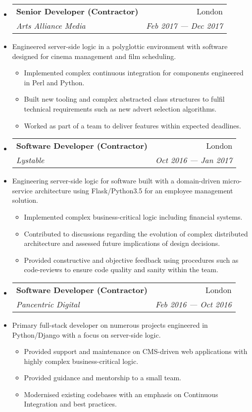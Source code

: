 \documentclass[letterpaper,11pt]{article}
\makeatletter
\newcommand{\ressubheading}[4]
    {\begin{tabular*}{180mm}{l@{\extracolsep{\fill}}r}
        \textbf{#1} & #2 \\
        \textit{#3} & \textit{#4} \\
    \end{tabular*}\vspace{-6pt}}
\newcommand{\resdescription}[1]{#1 \vspace{-0mm}}
\newcommand{\resitem}[1]{\item #1 \vspace{-2pt}}
\makeatother
\begin{document}
\begin{itemize}
        \item[]
            \ressubheading{Senior Developer (Contractor)}{London}{Arts Alliance Media}{Feb 2017 --- Dec 2017}
        \item[]
            \resdescription{Engineered server-side logic in a polyglottic environment with software designed for cinema management and film scheduling.}
            \begin{itemize}
                    \resitem{Implemented complex continuous integration for components engineered in Perl and Python.}
                    \resitem{Built new tooling and complex abstracted class structures to fulfil technical requirements such as new advert selection algorithms.}
                    \resitem{Worked as part of a team to deliver features within expected deadlines.}
            \end{itemize}
        \item[]
            \ressubheading{Software Developer (Contractor)}{London}{Lystable}{Oct 2016 --- Jan 2017}
        \item[]
            \resdescription{Engineering server-side logic for software built with a domain-driven micro-service architecture using Flask/Python3.5 for an employee management solution.}
            \begin{itemize}
                    \resitem{Implemented complex business-critical logic including financial systems.}
                    \resitem{Contributed to discussions regarding the evolution of complex distributed architecture and assessed future implications of design decisions.}
                    \resitem{Provided constructive and objective feedback using procedures such as code-reviews to ensure code quality and sanity within the team.}
            \end{itemize}
        \item[]
            \ressubheading{Software Developer (Contractor)}{London}{Pancentric Digital}{Feb 2016 --- Oct 2016}
        \item[]
            \resdescription{Primary full-stack developer on numerous projects engineered in Python/Django with a focus on server-side logic.}
            \begin{itemize}
                    \resitem{Provided support and maintenance on CMS-driven web applications with highly complex business-critical logic.}
                    \resitem{Provided guidance and mentorship to a small team.}
                    \resitem{Modernised existing codebases with an emphasis on Continuous Integration and best practices.}

\end{itemize}
\end{itemize}
\end{document}
